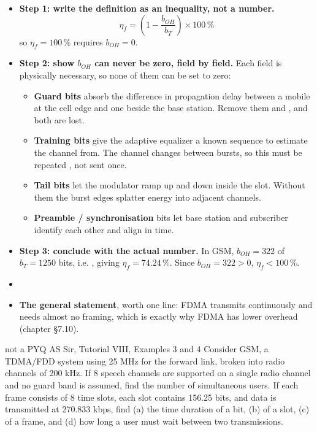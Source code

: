 \begin{itemize}
  \item \textbf{Step 1: write the definition as an inequality, not a number.}
        \[ \eta_f = \left(1 - \frac{b_{OH}}{b_T}\right)\times 100\,\% \]
        so \; $\eta_f = 100\,\%$ \; requires \; $b_{OH} = 0$.
  \item \textbf{Step 2: show $b_{OH}$ can never be zero, field by field.} Each field is
        physically necessary, so none of them can be set to zero:
  \begin{itemize}
    \item \textbf{Guard bits} absorb the difference in propagation delay between a mobile at
          the cell edge and one beside the base station. Remove them and , and both are lost.
    \item \textbf{Training bits} give the adaptive equalizer a known sequence to estimate the
          channel from. The channel changes between bursts, so this must be repeated
          , not sent once.
    \item \textbf{Tail bits} let the modulator ramp up and down inside the slot. Without them
          the burst edges splatter energy into adjacent channels.
    \item \textbf{Preamble / synchronisation} bits let base station and subscriber identify
          each other and align in time.
  \end{itemize}
  \item \textbf{Step 3: conclude with the actual number.} In GSM,
        $b_{OH} = 322$ of $b_T = 1250$ bits, i.e. ,
        giving $\eta_f = 74.24\,\%$. Since $b_{OH} = 322 > 0$, $\eta_f < 100\,\%$.
  \item {}
  \item \textbf{The general statement}, worth one line:  FDMA transmits continuously and needs almost no
        framing, which is exactly why FDMA has lower overhead (chapter \S7.10).
\end{itemize}

\begin{asked}[PROBLEM]{not a PYQ \textperiodcentered{} AS Sir, Tutorial VIII, Examples 3 and 4}
Consider GSM, a TDMA/FDD system using 25 MHz for the forward link, broken into radio channels
of 200 kHz. If 8 speech channels are supported on a single radio channel and no guard band is
assumed, find the number of simultaneous users. If each frame consists of 8 time slots, each
slot contains 156.25 bits, and data is transmitted at 270.833 kbps, find (a) the time duration
of a bit, (b) of a slot, (c) of a frame, and (d) how long a user must wait between two
transmissions.
\end{asked}

